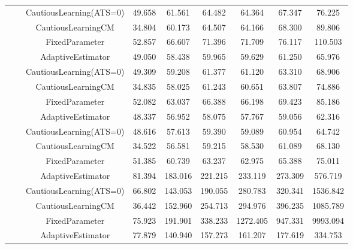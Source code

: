 \begin{table}[!h]
\begin{tabular}[t]{ccccccccc}
 &  & CautiousLearning(ATS=0) & 49.658 & 61.561 & 64.482 & 64.364 & 67.347 & 76.225\\

 &  & CautiousLearningCM & 34.804 & 60.173 & 64.507 & 64.166 & 68.300 & 89.806\\

 & \multirow[t]{-4}{*}{\centering\arraybackslash 1.00} & FixedParameter & 52.857 & 66.607 & 71.396 & 71.709 & 76.117 & 110.503\\
\cmidrule{2-9}
 &  & AdaptiveEstimator & 49.050 & 58.438 & 59.965 & 59.629 & 61.250 & 65.976\\

 &  & CautiousLearning(ATS=0) & 49.309 & 59.208 & 61.377 & 61.120 & 63.310 & 68.906\\

 &  & CautiousLearningCM & 34.835 & 58.025 & 61.243 & 60.651 & 63.807 & 74.886\\

 & \multirow[t]{-4}{*}{\centering\arraybackslash 1.25} & FixedParameter & 52.082 & 63.037 & 66.388 & 66.198 & 69.423 & 85.186\\
\cmidrule{2-9}
 &  & AdaptiveEstimator & 48.337 & 56.952 & 58.075 & 57.767 & 59.056 & 62.316\\

 &  & CautiousLearning(ATS=0) & 48.616 & 57.613 & 59.390 & 59.089 & 60.954 & 64.742\\

 &  & CautiousLearningCM & 34.522 & 56.581 & 59.215 & 58.530 & 61.089 & 68.130\\

\multirow[t]{-28}{*}{\centering\arraybackslash 50} & \multirow[t]{-4}{*}{\centering\arraybackslash 1.50} & FixedParameter & 51.385 & 60.739 & 63.237 & 62.975 & 65.388 & 75.011\\
\cmidrule{1-9}
 &  & AdaptiveEstimator & 81.394 & 183.016 & 221.215 & 233.119 & 273.309 & 576.719\\

 &  & CautiousLearning(ATS=0) & 66.802 & 143.053 & 190.055 & 280.783 & 320.341 & 1536.842\\

 &  & CautiousLearningCM & 36.442 & 152.960 & 254.713 & 294.976 & 396.235 & 1085.789\\

 & \multirow[t]{-4}{*}{\centering\arraybackslash 0.25} & FixedParameter & 75.923 & 191.901 & 338.233 & 1272.405 & 947.331 & 9993.094\\
\cmidrule{2-9}
 &  & AdaptiveEstimator & 77.879 & 140.940 & 157.273 & 161.207 & 177.619 & 334.753\\


\end{tabular}
\end{table}
